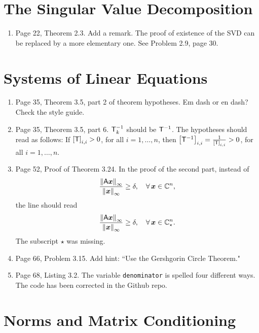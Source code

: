 \documentclass{book}
\begin{document}
	\chapter{The Singular Value Decomposition}
	
	\begin{enumerate}
	\item
Page 22, Theorem 2.3. Add a remark. The proof of existence of the SVD can be replaced by a more elementary one. See Problem 2.9, page 30.
	\end{enumerate}
	
	\chapter{Systems of Linear Equations}
	
	\begin{enumerate}
	\item 
Page 35, Theorem 3.5, part 2 of theorem hypotheses. Em dash or en dash? Check the style guide.
	\item 
Page 35, Theorem 3.5, part 6. $\mathsf{T}_k^{-1}$ should be $\mathsf{T}^{-1}$. The hypotheses should read as follows: If $\left[ \mathsf{T} \right]_{i,i} >0$, for all $i =1, \ldots , n$, then  $\left[ \mathsf{T}^{-1} \right]_{i,i} = \frac{1}{\left[ \mathsf{T} \right]_{i,i}} > 0$, for all $i =1, \ldots , n$.

	\item
Page 52, Proof of Theorem 3.24. In the proof of the second part, instead of 
	\[
\frac{\left\| \mathsf{A}\boldsymbol{x} \right\|_\infty}{\left\| \boldsymbol{x} \right\|_\infty} \ge \delta, \quad \forall \, \boldsymbol{x} \in \mathbb C^n,
	\]
the line should read
	\[
\frac{\left\| \mathsf{A}\boldsymbol{x} \right\|_\infty}{\left\| \boldsymbol{x} \right\|_\infty} \ge \delta, \quad \forall \, \boldsymbol{x} \in \mathbb C_\star^n.	
	\]
The subscript $\star$ was missing.

	\item
Page 66, Problem 3.15. Add hint: ``Use the Gershgorin Circle Theorem."

	\item
Page 68, Listing 3.2. The variable {\tt denominator} is spelled four different ways. The code has been corrected in the Github repo.
	\end{enumerate}
	
	\chapter{Norms and Matrix Conditioning}
	
\end{document}

